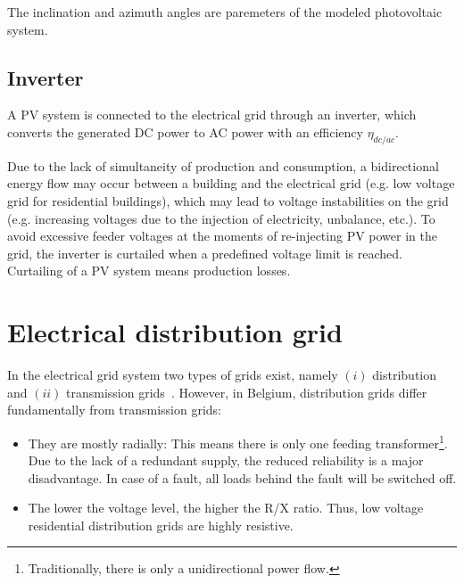 The inclination and azimuth angles are paremeters of the modeled photovoltaic system.

\subsection{Inverter}
A PV system is connected to the electrical grid through an inverter, which converts the generated DC power to AC power with an efficiency $\eta_{dc/ac}$.

Due to the lack of simultaneity of production and consumption, a bidirectional energy flow may occur between a building and the electrical grid (e.g. low voltage grid for residential buildings), which may lead to voltage instabilities on the grid (e.g. increasing voltages due to the injection of electricity, unbalance, etc.). To avoid excessive feeder voltages at the moments of re-injecting PV power in the grid, the inverter is curtailed when a predefined voltage limit is reached. Curtailing of a PV system means production losses.


\section{Electrical distribution grid}
In the electrical grid system two types of grids exist, namely $(i)$ distribution and $(ii)$ transmission grids~\cite{ehaesen,willis}. However, in Belgium, distribution grids differ fundamentally from transmission grids:

\begin{itemize}
\item They are mostly radially: This means there is only one feeding transformer\footnote{Traditionally, there is only a unidirectional power flow.}. Due to the lack of a redundant supply, the reduced reliability is a major disadvantage. In case of a fault, all loads behind the fault will be switched off.
\item The lower the voltage level, the higher the R/X ratio. Thus, low voltage residential distribution grids are highly resistive.
\end{itemize}

